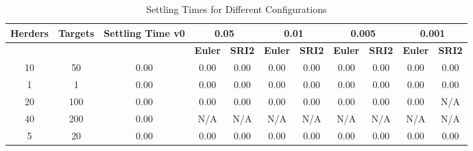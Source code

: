 
\begin{table}[ht]
\centering
\begin{tabular}{|c|c|c|c|c|c|c|c|c|c|c|}
\hline
\textbf{Herders} & \textbf{Targets} & \textbf{Settling Time v0} & \multicolumn{2}{c|}{0.05} & \multicolumn{2}{c|}{0.01} & \multicolumn{2}{c|}{0.005} & \multicolumn{2}{c|}{0.001} \\
\hline
& & & \textbf{Euler} & \textbf{SRI2} & \textbf{Euler} & \textbf{SRI2} & \textbf{Euler} & \textbf{SRI2} & \textbf{Euler} & \textbf{SRI2} \\
\hline
10 & 50 & 0.00 & 0.00 & 0.00 & 0.00 & 0.00 & 0.00 & 0.00 & 0.00 & 0.00 \\ \hline
1 & 1 & 0.00 & 0.00 & 0.00 & 0.00 & 0.00 & 0.00 & 0.00 & 0.00 & 0.00 \\ \hline
20 & 100 & 0.00 & 0.00 & 0.00 & 0.00 & 0.00 & 0.00 & 0.00 & 0.00 & N/A \\ \hline
40 & 200 & 0.00 & N/A & N/A & N/A & N/A & N/A & N/A & N/A & N/A \\ \hline
5 & 20 & 0.00 & 0.00 & 0.00 & 0.00 & 0.00 & 0.00 & 0.00 & 0.00 & 0.00 \\ \hline
\end{tabular}
\caption{Settling Times for Different Configurations}
\label{tab:settling_times}
\end{table}
